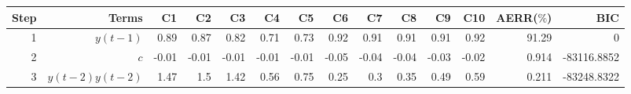 \begin{tabular}{rrrrrrrrrrrrrr}
Step & Terms & C1 & C2 & C3 & C4 & C5 & C6 & C7 & C8 & C9 & C10 & AERR($\%$) & BIC \\ 
\hline 
1 & $y(t-1)$ & 0.89 & 0.87 & 0.82 & 0.71 & 0.73 & 0.92 & 0.91 & 0.91 & 0.91 & 0.92 & 91.29 & 0 \\ 
2 & $c$ & -0.01 & -0.01 & -0.01 & -0.01 & -0.01 & -0.05 & -0.04 & -0.04 & -0.03 & -0.02 & 0.914 & -83116.8852 \\ 
3 & $y(t-2)y(t-2)$ & 1.47 & 1.5 & 1.42 & 0.56 & 0.75 & 0.25 & 0.3 & 0.35 & 0.49 & 0.59 & 0.211 & -83248.8322 \\ 
\hline 
\end{tabular}